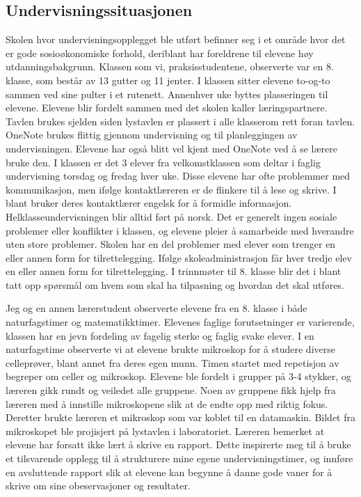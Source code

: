 \documentclass[main.tex]{subfiles}
\begin{document}
\subsection*{Undervisningssituasjonen}
Skolen hvor undervisningsopplegget ble utført befinner seg i et område hvor det er gode sosioøkonomiske forhold, 
deriblant har foreldrene til elevene høy utdanningsbakgrunn. Klassen som vi, praksisstudentene, observerte var en 8. 
klasse, som består av 13 gutter og 11 jenter. I klassen sitter elevene to-og-to sammen ved sine pulter i et 
rutenett. Annenhver uke byttes plasseringen til elevene. Elevene blir fordelt sammen med det skolen 
kaller læringspartnere. Tavlen brukes sjelden siden lystavlen er plassert i alle klasserom rett foran 
tavlen. OneNote brukes flittig gjennom undervisning og til planleggingen av undervisningen. 
Elevene har også blitt vel kjent med OneNote ved å se lærere bruke den. 
I klassen er det 3 elever fra velkomstklassen som deltar i faglig undervisning torsdag og fredag hver uke. 
Disse elevene har ofte problemmer med kommunikasjon, men ifølge kontaktlæreren er de flinkere til å 
lese og skrive. I blant bruker deres kontaktlærer engelsk for å formidle informasjon. 
Helklasseundervisningen blir alltid ført på norsk. Det er generelt ingen sosiale problemer eller 
konflikter i klassen, og elevene pleier å samarbeide med hverandre uten store problemer. Skolen har 
en del problemer med elever som trenger en eller annen form for tilrettelegging. Ifølge 
skoleadministrasjon får hver tredje elev en eller annen form for tilrettelegging. I trinnmøter til 
8. klasse blir det i blant tatt opp spørsmål om hvem som skal ha tilpasning og hvordan det skal 
utføres.
\newline

Jeg og en annen lærerstudent observerte elevene fra en 8. klasse i både naturfagstimer og matematikktimer. 
Elevenes faglige forutsetninger er varierende, klassen har en jevn fordeling av fagelig sterke og faglig 
svake elever. I en naturfagstime observerte vi at elevene brukte mikroskop for å studere diverse celleprøver, 
blant annet fra deres egen munn. Timen startet med repetisjon av begreper om celler og mikroskop. Elevene 
ble fordelt i grupper på 3-4 stykker, og læreren gikk rundt og veiledet alle gruppene. Noen av gruppene fikk 
hjelp fra læreren med å innstille mikroskopene slik at de endte opp med riktig fokus. Deretter brukte læreren 
et mikroskop som var koblet til en datamaskin. Bildet fra mikroskopet ble projisjert på lystavlen i laboratoriet. 
Læreren bemerket at elevene har forsatt ikke lært å skrive en rapport. Dette inspirerte meg til å bruke et 
tilsvarende opplegg til å strukturere mine egene undervisningstimer, og innføre en avsluttende rapport slik at
elevene kan begynne å danne gode vaner for å skrive om sine obeservasjoner og resultater.

\end{document}
